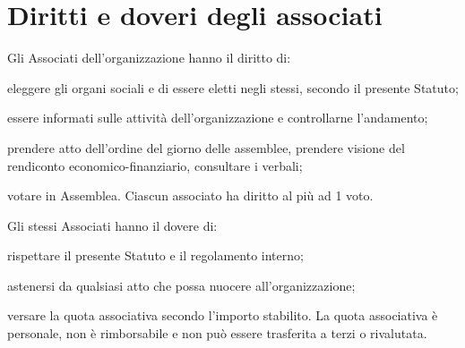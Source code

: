\documentclass[legalpaper, 11pt]{exam}
\let\tempone\enumerate
\let\temptwo\endenumerate
\renewenvironment{enumerate}{\tempone\addtolength{\itemsep}{-0.45\baselineskip}}{\temptwo}
\begin{document}
\section{Diritti e doveri degli associati}
\begin{enumerate}
 \item Gli Associati dell'organizzazione hanno il diritto di:
 \vspace{-5pt}
 \begin{enumerate}
  \item eleggere gli organi sociali e di essere eletti negli stessi, secondo il presente Statuto;
  \item essere informati sulle attività dell’organizzazione e controllarne l’andamento;
  \item prendere atto dell’ordine del giorno delle assemblee, prendere visione del rendiconto economico-finanziario, consultare i verbali;
  \item votare in Assemblea. Ciascun associato ha diritto al più ad 1 voto.
 \end{enumerate}
\item Gli stessi Associati hanno il dovere di:
\vspace{-5pt}
\begin{enumerate}
 \item rispettare il presente Statuto e il regolamento interno;
 \item astenersi da qualsiasi atto che possa nuocere all’organizzazione;
 \item versare la quota associativa secondo l’importo stabilito. La quota associativa è personale, non è rimborsabile e non può essere trasferita a terzi o rivalutata.
\end{enumerate}

\end{enumerate}
\end{document}
